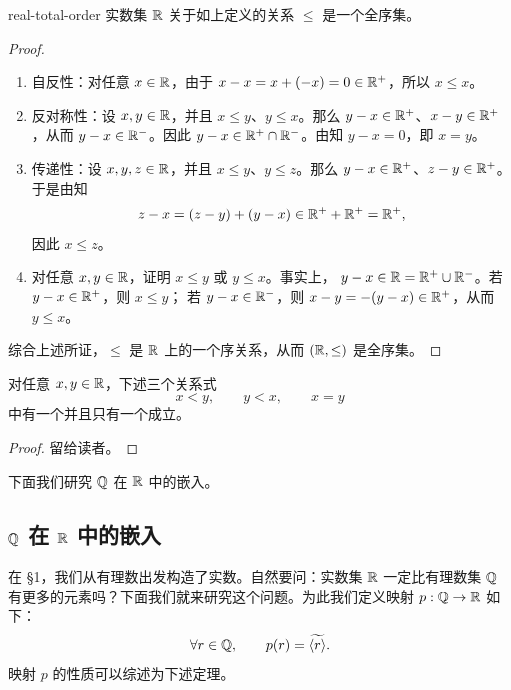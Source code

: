 \begin{mythm}{}{real-total-order}
实数集 \(\mathbb{R}\) 关于如上定义的关系 \(\leq\) 是一个全序集。
\end{mythm}

\begin{proof}
\begin{enumerate}[label=\arabic*)]
   
  \item 自反性：对任意 \(x\in\mathbb{R}\)，由于
  \(x-x=x+(-x)=0\in\mathbb{R}^+\)，所以 \(x\leq x\)。

  \item 反对称性：设 \(x,y\in\mathbb{R}\)，并且 \(x\leq y\)、\(y\leq x\)。那么
  \(y-x\in\mathbb{R}^+\)、\(x-y\in\mathbb{R}^+\)，从而 \(y-x\in\mathbb{R}^-\)。因此
  \(y-x\in\mathbb{R}^+\cap\mathbb{R}^-\)。由知
  \(y-x=0\)，即 \(x=y\)。

  \item 传递性：设 \(x,y,z\in\mathbb{R}\)，并且 \(x\leq y\)、\(y\leq z\)。那么
  \(y-x\in\mathbb{R}^+\)、\(z-y\in\mathbb{R}^+\)。于是由知
  \[
  z-x=(z-y)+(y-x)\in\mathbb{R}^++\mathbb{R}^+=\mathbb{R}^+,
  \]
  因此 \(x\leq z\)。

  \item 对任意 \(x,y\in\mathbb{R}\)，证明 \(x\leq y\) 或 \(y\leq x\)。事实上，
  \(y-x\in\mathbb{R}=\mathbb{R}^+\cup\mathbb{R}^-\)。若 \(y-x\in\mathbb{R}^+\)，则 \(x\leq y\)；
  若 \(y-x\in\mathbb{R}^-\)，则 \(x-y=-(y-x)\in\mathbb{R}^+\)，从而 \(y\leq x\)。
\end{enumerate}
综合上述所证，\(\leq\) 是 \(\mathbb{R}\) 上的一个序关系，从而
\((\mathbb{R},\leq)\) 是全序集。
\end{proof}

\begin{mycor*}{}
对任意 \(x,y\in\mathbb{R}\)，下述三个关系式
\[
x<y,\qquad y<x,\qquad x=y
\]
中有一个并且只有一个成立。
\end{mycor*}

\begin{proof}
留给读者。
\end{proof}

下面我们研究 \(\mathbb{Q}\) 在 \(\mathbb{R}\) 中的嵌入。

\subsection{\(\mathbb{Q}\) 在 \(\mathbb{R}\) 中的嵌入}
	\label{sec:2-3-2}

在 §1，我们从有理数出发构造了实数。自然要问：实数集 \(\mathbb{R}\) 一定比有理数集
\(\mathbb{Q}\) 有更多的元素吗？下面我们就来研究这个问题。为此我们定义映射
\(p:\mathbb{Q}\to\mathbb{R}\) 如下：
\[
\forall r\in\mathbb{Q},
\qquad
p(r)=\widetilde{\langle r\rangle}.
\]
映射 \(p\) 的性质可以综述为下述定理。

